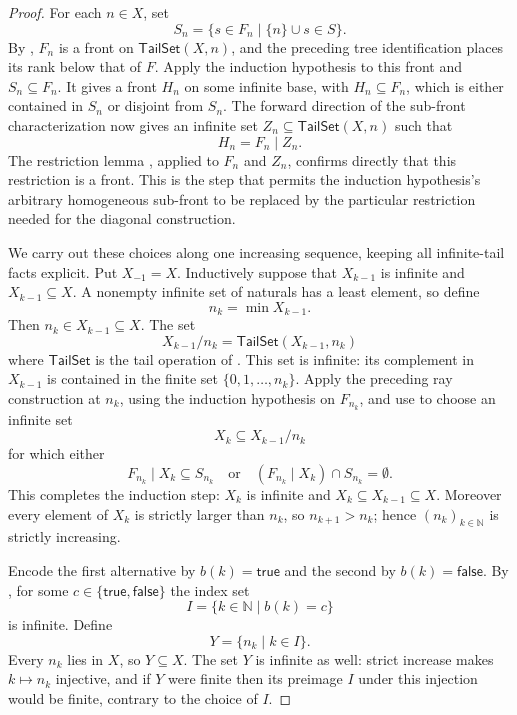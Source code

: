 \begin{proof}
For each $n\in X$, set
\[
 S_n=\{s\in F_n\mid \{n\}\cup s\in S\}.
\]
By , $F_n$ is a front on
$\mathsf{TailSet}(X,n)$, and the preceding tree identification places its
rank below that of $F$.  Apply the induction hypothesis to this front and
$S_n\subseteq F_n$.  It gives a front $H_n$ on some infinite base, with
$H_n\subseteq F_n$, which is either contained in $S_n$ or disjoint from
$S_n$.  The forward direction of the sub-front characterization
 now gives an infinite set
$Z_n\subseteq\mathsf{TailSet}(X,n)$ such that
\[
 H_n=F_n\mathbin{|}Z_n.
\]
The restriction lemma , applied to $F_n$ and
$Z_n$, confirms directly that this restriction is a front.  This is the
step that permits the induction hypothesis's
arbitrary homogeneous sub-front to be replaced by the particular restriction
needed for the diagonal construction.

We carry out these choices along one increasing sequence, keeping all
infinite-tail facts explicit.  Put $X_{-1}=X$.  Inductively suppose that
$X_{k-1}$ is infinite and $X_{k-1}\subseteq X$.  A nonempty infinite set of
naturals has a least element, so define
\[
 n_k=\min X_{k-1}.
\]
Then $n_k\in X_{k-1}\subseteq X$.  The set
\[
 X_{k-1}/n_k=\mathsf{TailSet}(X_{k-1},n_k)
\]
where $\mathsf{TailSet}$ is the tail operation of .  This
set is infinite: its complement in $X_{k-1}$ is contained in the finite set
$\{0,1,\ldots,n_k\}$.  Apply the preceding ray construction at $n_k$,
using the induction hypothesis on $F_{n_k}$, and use
 to choose an infinite set
\[
 X_k\subseteq X_{k-1}/n_k
\]
for which either
\[
 F_{n_k}\mathbin{|}X_k\subseteq S_{n_k}
 \quad\text{or}\quad
 (F_{n_k}\mathbin{|}X_k)\cap S_{n_k}=\emptyset.
\]
This completes the induction step: $X_k$ is infinite and
$X_k\subseteq X_{k-1}\subseteq X$.  Moreover every element of $X_k$ is
strictly larger than $n_k$, so $n_{k+1}>n_k$; hence $(n_k)_{k\in\mathbb N}$
is strictly increasing.

Encode the first alternative by $b(k)=\mathsf{true}$ and the second by
$b(k)=\mathsf{false}$.  By
, for some $c\in\{\mathsf{true},
\mathsf{false}\}$ the index set
\[
 I=\{k\in\mathbb N\mid b(k)=c\}
\]
is infinite.  Define
\[
 Y=\{n_k\mid k\in I\}.
\]
Every $n_k$ lies in $X$, so $Y\subseteq X$.  The set $Y$ is infinite as
well: strict increase makes $k\mapsto n_k$ injective, and if $Y$ were
finite then its preimage $I$ under this injection would be finite, contrary
to the choice of $I$.


\end{proof}
